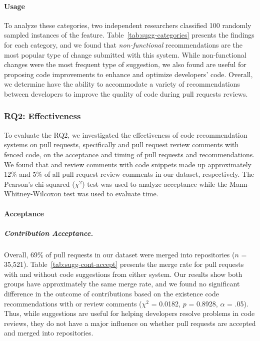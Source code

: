 \paragraph{Usage} To analyze these categories, two independent researchers classified 100 randomly sampled instances of the \suggs feature. Table~\ref{tab:sugg-categories} presents the findings for each category, and we found that \textit{non-functional} recommendations are the most popular type of change submitted with this system. While non-functional changes were the most frequent type of suggestion, we also found \sugg are useful for proposing code improvements to enhance and optimize developers' code. Overall, we determine \suggs have the ability to accommodate a variety of recommendations between developers to improve the quality of code during pull requests reviews.






\subsubsection{RQ2: Effectiveness}

To evaluate the RQ2, we investigated the effectiveness of code recommendation systems on pull requests, specifically \suggs and pull request review comments with fenced code, on the acceptance and timing of pull requests and recommendations. We found that \sugg and review comments with code snippets made up approximately 12\% and 5\% of all pull request review comments in our dataset, respectively. The Pearson’s chi-squared ($\chi^2$) test was used to analyze acceptance while the Mann-Whitney-Wilcoxon test was used to evaluate time.

\paragraph*{Acceptance}

\subparagraph{Contribution Acceptance.}

Overall, 69\% of pull requests in our dataset were merged into repositories ($n$ = 35,521). Table~\ref{tab:sugg-cont-accept} presents the merge rate for pull requests with and without code suggestions from either system. Our results show both groups have approximately the same merge rate, and we found no significant difference in the outcome of contributions based on the existence code recommendations with \sugg or review comments ($\chi^2$ = 0.0182, $p$ = 0.8928, $\alpha$ = .05). Thus, while suggestions are useful for helping developers resolve problems in code reviews, they do not have a major influence on whether pull requests are accepted and merged into repositories.


